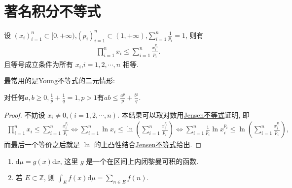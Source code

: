 \documentclass[../../main.tex]{subfiles}
\begin{document}
\section{著名积分不等式}

\begin{theorem}[Young不等式初等形式]\label{theorem:Young不等式初等形式}
设 $(x_i)_{i = 1}^n \subset [0, +\infty)$,$(p_i)_{i = 1}^n \subset (1, +\infty)$,$\sum_{i = 1}^n \frac{1}{p_i} = 1$, 则有
\begin{align*}
\prod_{i = 1}^n x_i \leqslant \sum_{i = 1}^n \frac{x_i^{p_i}}{p_i}.
\end{align*}
且等号成立条件为所有 $x_i$,$i = 1,2,\cdots,n$ 相等.
\end{theorem}
\begin{note}
最常用的是Young不等式的二元情形:

对任何$a,b\geqslant 0,\frac{1}{p}+\frac{1}{q}=1,p>1$有$ab\leqslant \frac{a^p}{p}+\frac{b^q}{q}.$
\end{note}
\begin{proof}
不妨设 $x_i \neq 0$,$(i = 1,2,\cdots,n)$. 本结果可以取对数用\hyperref[theorem:Jensen不等式1111]{Jensen不等式}证明, 即
\begin{align*}
\prod_{i = 1}^n x_i \leqslant \sum_{i = 1}^n \frac{x_i^{p_i}}{p_i}\Leftrightarrow \sum_{i = 1}^n \ln x_i \leqslant \ln \left(\sum_{i = 1}^n \frac{x_i^{p_i}}{p_i}\right) \Leftrightarrow \sum_{i = 1}^n \frac{1}{p_i} \ln x_i^{p_i} \leqslant \ln \left(\sum_{i = 1}^n \frac{x_i^{p_i}}{p_i}\right),
\end{align*}
而最后一个等价之后就是 $\ln$ 的上凸性结合\hyperref[theorem:Jensen不等式1111]{Jensen不等式}给出.

\end{proof}

\begin{definition}
\begin{enumerate}[(1)]
\item $\mathrm{d}\mu = g(x)\mathrm{d}x$, 这里 $g$ 是一个在区间上内闭黎曼可积的函数.
\item 若 $E \subset \mathbb{Z}$, 则 $\int_E f(x) \mathrm{d}\mu = \sum_{n \in E} f(n)$.
\end{enumerate}
\end{definition}
\end{document}

